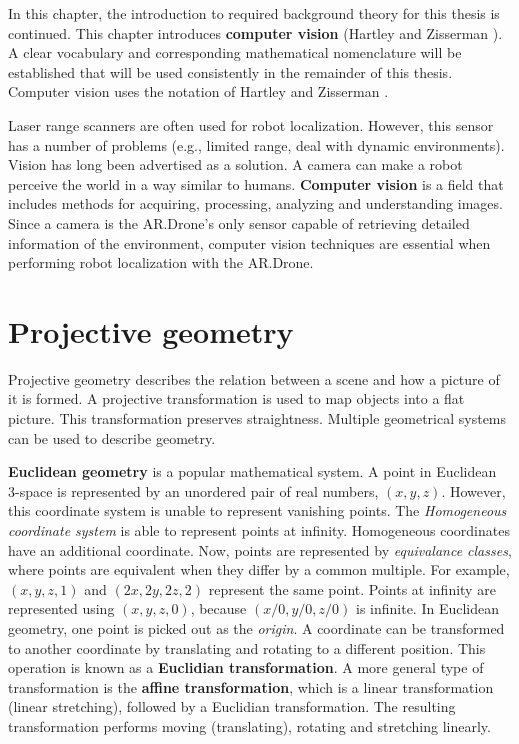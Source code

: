 In this chapter, the introduction to required background theory for this thesis is continued.
This chapter introduces \textbf{computer vision} (Hartley and Zisserman \cite{Hartley2004}).
A clear vocabulary and corresponding mathematical nomenclature will be established that will be used consistently in the remainder of this thesis.
Computer vision uses the notation of Hartley and Zisserman \cite{Hartley2004}.

Laser range scanners are often used for robot localization.
However, this sensor has a number of problems (e.g., limited range, deal with dynamic environments).
Vision has long been advertised as a solution.
A camera can make a robot perceive the world in a way similar to humans.
\textbf{Computer vision} is a field that includes methods for acquiring, processing, analyzing and understanding images.
Since a camera is the AR.Drone's only sensor capable of retrieving detailed information of the environment, computer vision techniques are essential when performing robot localization with the AR.Drone.

\section{Projective geometry}
\label{sec:background-projective-geometry}
Projective geometry describes the relation between a scene and how a picture of it is formed.
A projective transformation is used to map objects into a flat picture.
This transformation preserves straightness.
Multiple geometrical systems can be used to describe geometry.

\textbf{Euclidean geometry} is a popular mathematical system.
A point in Euclidean 3-space is represented by an unordered pair of real numbers, $(x, y, z)$.
However, this coordinate system is unable to represent vanishing points.
The \textit{Homogeneous coordinate system} is able to represent points at infinity.
Homogeneous coordinates have an additional coordinate.
Now, points are represented by \textit{equivalance classes}, where points are equivalent when they differ by a common multiple.
For example, $(x, y, z, 1)$ and $(2x, 2y, 2z, 2)$ represent the same point.
Points at infinity are represented using $(x, y, z, 0)$, because $(x/0, y/0, z/0)$ is infinite.
In Euclidean geometry, one point is picked out as the \textit{origin}.
A coordinate can be transformed to another coordinate by translating and rotating to a different position.
This operation is known as a \textbf{Euclidian transformation}.
A more general type of transformation is the \textbf{affine transformation}, which is a linear transformation (linear stretching), followed by a Euclidian transformation.
The resulting transformation performs moving (translating), rotating and
stretching linearly.

